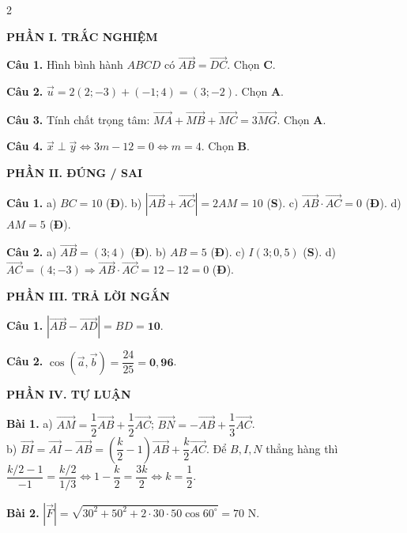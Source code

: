 \documentclass[10pt,a4paper]{article}
\begin{document}
\begin{multicols}{2}
\raggedcolumns
\small
{}

\textsf{\textbf{\color{navy}PHẦN I. TRẮC NGHIỆM}}

\textbf{Câu 1.} Hình bình hành $ABCD$ có $\vec{AB} = \vec{DC}$. Chọn \textbf{C}.

\textbf{Câu 2.} $\vec{u} = 2(2; -3) + (-1; 4) = (3; -2)$. Chọn \textbf{A}.

\textbf{Câu 3.} Tính chất trọng tâm: $\vec{MA} + \vec{MB} + \vec{MC} = 3\vec{MG}$. Chọn \textbf{A}.

\textbf{Câu 4.} $\vec{x}\perp\vec{y} \Leftrightarrow 3m - 12 = 0 \Leftrightarrow m = 4$. Chọn \textbf{B}.

\textsf{\textbf{\color{navy}PHẦN II. ĐÚNG / SAI}}

\textbf{Câu 1.} a) $BC = 10$ (\textbf{Đ}). b) $|\vec{AB} + \vec{AC}| = 2AM = 10$ (\textbf{S}). c) $\vec{AB}\cdot\vec{AC} = 0$ (\textbf{Đ}). d) $AM = 5$ (\textbf{Đ}).

\textbf{Câu 2.} a) $\vec{AB} = (3; 4)$ (\textbf{Đ}). b) $AB = 5$ (\textbf{Đ}). c) $I(3; 0{,}5)$ (\textbf{S}). d) $\vec{AC} = (4; -3) \Rightarrow \vec{AB}\cdot\vec{AC} = 12 - 12 = 0$ (\textbf{Đ}).

\textsf{\textbf{\color{navy}PHẦN III. TRẢ LỜI NGẮN}}

\textbf{Câu 1.} $|\vec{AB} - \vec{AD}| = BD = \mathbf{10}$.

\textbf{Câu 2.} $\cos(\vec{a}, \vec{b}) = \dfrac{24}{25} = \mathbf{0{,}96}$.

\textsf{\textbf{\color{navy}PHẦN IV. TỰ LUẬN}}

\textbf{Bài 1.} a) $\vec{AM} = \dfrac{1}{2}\vec{AB} + \dfrac{1}{2}\vec{AC}$; $\vec{BN} = -\vec{AB} + \dfrac{1}{3}\vec{AC}$.\\
b) $\vec{BI} = \vec{AI} - \vec{AB} = \left(\dfrac{k}{2} - 1\right)\vec{AB} + \dfrac{k}{2}\vec{AC}$. Để $B, I, N$ thẳng hàng thì $\dfrac{k/2 - 1}{-1} = \dfrac{k/2}{1/3} \Leftrightarrow 1 - \dfrac{k}{2} = \dfrac{3k}{2} \Leftrightarrow k = \dfrac{1}{2}$.

\textbf{Bài 2.} $|\vec{F}| = \sqrt{30^2 + 50^2 + 2\cdot 30\cdot 50\cos 60^\circ} = 70\text{ N}$.

\end{multicols}
\end{document}

